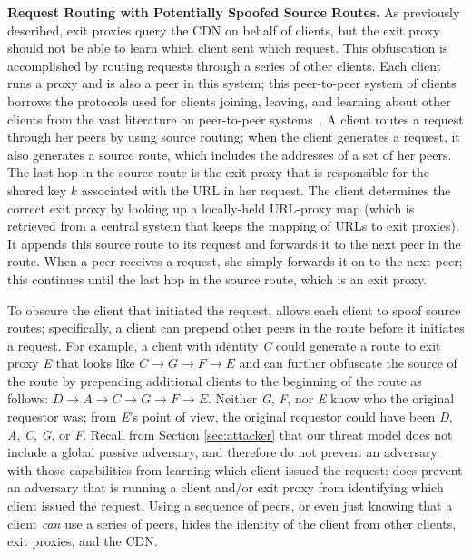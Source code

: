 \textbf{Request Routing with Potentially Spoofed Source Routes.}
As previously described, exit proxies query the CDN on behalf of clients, but the
exit proxy
should not be able to learn which client sent which request.  This obfuscation is
accomplished by routing requests through
a series of other clients.  Each client runs a proxy and is
also a peer in this system; this 
peer-to-peer system of clients borrows the 
protocols used for clients joining, leaving, and learning about other clients from
the vast literature on peer-to-peer systems~\cite{monnerat2006d1ht,risson2006stable,zhu2005efficient,gupta2003kelips,lesniewski2008sybil,leong2004achieving}. A client routes a request through
her peers by using source routing; when the client generates a request, it also
generates a source route, which includes
the addresses of a set of her peers.  The last hop in the source route is the exit proxy that is responsible for the 
shared key $k$ associated with the URL in her request.  The client determines the correct exit proxy by looking up a locally-held URL-proxy map (which is retrieved from a central system that keeps the mapping of URLs to exit proxies).  
It appends this source route to its request and forwards it to the next peer
in the route.  When a peer receives
a request, she simply forwards it on to the next peer; this continues until the last hop in the source route, which 
is an exit proxy. 

To obscure the client that initiated the request, \system{}
allows each client to spoof source routes; specifically, a client can prepend
other peers in the route before it initiates a request.  For example, a client
with identity {\it C} could generate a route to exit proxy {\it E} that looks
like $C \rightarrow G \rightarrow F \rightarrow E$ and can further obfuscate
the source of the route by prepending additional clients to the beginning of
the route as follows: $D \rightarrow A \rightarrow C \rightarrow G \rightarrow
F \rightarrow E$. Neither {\it G}, {\it F}, nor {\it E} know who the original requestor was; from {\it E}'s point of 
view, the original requestor could have been {\it D}, {\it A}, {\it C}, {\it G},
or {\it F}.  Recall from Section \ref{sec:attacker} that our threat model does not 
include a global passive adversary, and therefore do not prevent an adversary with those capabilities 
from learning which client issued the request; \system{} does prevent an adversary that is running a 
client and/or exit proxy from identifying which client issued the request. Using a sequence of 
peers, or even just knowing that a client {\it can} use a series of peers, hides
the identity of the client 
from other clients, exit proxies, and the CDN. 

